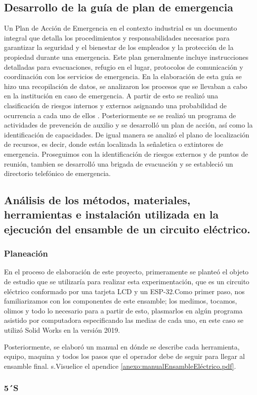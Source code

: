 \begin{itemize}
    \subsection{Desarrollo de la guía de plan de emergencia} Un Plan de Acción de Emergencia en el contexto industrial es un documento integral que detalla los procedimientos y responsabilidades necesarios para garantizar la seguridad y el bienestar de los empleados y la protección de la propiedad durante una emergencia. Este plan generalmente incluye instrucciones detalladas para evacuaciones, refugio en el lugar, protocolos de comunicación y coordinación con los servicios de emergencia.
    En la elaboración de esta guía se hizo una recopilación de datos, se analizaron los procesos que se llevaban a cabo en la institución en caso de emergencia. A partir de esto se realizó una clasificación de riesgos internos y externos asignando una probabilidad de ocurrencia a cada uno de ellos . Posteriormente se se realizó un programa de actividades de prevención de auxilio y se desarrolló un plan de acción, así como la identificación de capacidades. De igual manera se analizó el plano de localización de recursos, es decir, donde están localizada la señaletica o extintores de emergencia.
    Proseguimos con la identificación de riesgos externos y de puntos de reunión, tambien se desarrolló una brigada de evacuación y se estableció un directorio telefónico de emergencia.
    \subsection{Análisis de los métodos, materiales, herramientas e instalación utilizada en la ejecución del ensamble de un circuito eléctrico.}

    \subsubsection{Planeación}
    
    En el proceso de elaboración de este proyecto, primeramente se planteó el objeto de estudio que se utilizaría para realizar esta experimentación, que es un circuito eléctrico conformado por una tarjeta LCD y un ESP-32.Como primer paso, nos familiarizamos con los componentes de este ensamble; los medimos, tocamos, olimos y todo lo necesario para a partir de esto, plasmarlos en algún programa asistido por computadora especificando las medias de cada uno, en este caso se utilizó Solid Works en la versión 2019.
    
     Posteriormente, se elaboró un manual en dónde se describe cada herramienta, equipo, maquina y todos los pasos que el operador debe de seguir para llegar al ensamble final. s.Visuelice el apendice \ref{anexo:manualEnsambleEléctrico.pdf}.
    
    
    \subsubsection{5´S}
    \end{itemize}
    
